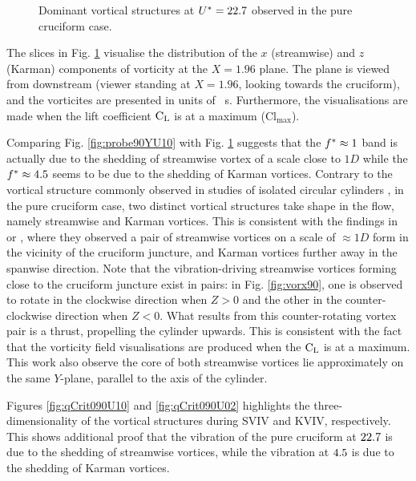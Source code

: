 \documentclass[oneside]{utmthesis}
\begin{document}
\begin{figure}[!h]
  \caption{Dominant vortical structures at $U^{*} = 22.7$ observed in the pure cruciform case.} \label{fig:vortStruct90}
\end{figure}

The slices in Fig. \ref{fig:vortStruct90} visualise the distribution of the $x$ (streamwise) and $z$ (Karman) components of vorticity at the $X = 1.96$ plane. The plane is viewed from downstream (viewer standing at $X = 1.96$, looking towards the cruciform), and the vorticites are presented in units of \si{\per\second}. Furthermore, the visualisations are made when the lift coefficient $\text{C}_{\text{L}}$ is at a maximum ($\text{Cl}_{\text{max}}$).

Comparing Fig. \ref{fig:probe90YU10} with Fig. \ref{fig:vortStruct90} suggests that the $f^{*} \approx 1$ band is actually due to the shedding of streamwise vortex of a scale close to $1D$ while the $f^{*} \approx 4.5$ seems to be due to the shedding of Karman vortices. Contrary to the vortical structure commonly observed in studies of isolated circular cylinders \citep{Deng2007,Kinaci2016,Duranay2020}, in the pure cruciform case, two distinct vortical structures take shape in the flow, namely streamwise and Karman vortices. This is consistent with the findings in \citet{Koide2017} or \citet{Zhao2018a}, where they observed a pair of streamwise vortices on a scale of $\approx 1D$ form in the vicinity of the cruciform juncture, and Karman vortices further away in the spanwise direction. Note that the vibration-driving streamwise vortices forming close to the cruciform juncture exist in pairs: in Fig. \ref{fig:vorx90}, one is observed to rotate in the clockwise direction when $Z > 0$ and the other in the counter-clockwise direction when $Z < 0$. What results from this counter-rotating vortex pair is a thrust, propelling the cylinder upwards. This is consistent with the fact that the vorticity field visualisations are produced when the $\text{C}_{\text{L}}$ is at a maximum. This work also observe the core of both streamwise vortices lie approximately on the same $Y$-plane, parallel to the axis of the cylinder.

Figures \ref{fig:qCrit090U10} and \ref{fig:qCrit090U02} highlights the three-dimensionality of the vortical structures during SVIV and KVIV, respectively. This shows additional proof that the vibration of the pure cruciform at $22.7$ is due to the shedding of streamwise vortices, while the vibration at $4.5$ is due to the shedding of Karman vortices.
\end{document}
